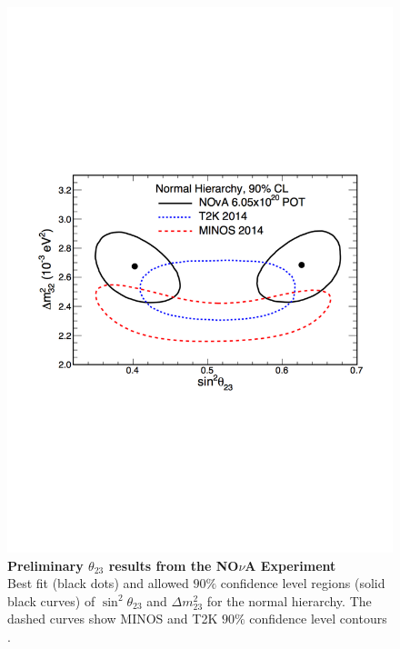 \begin{figure}
	\begin{center}
		\includegraphics[scale=0.7]{Figures/nova_result.pdf}
		\caption[Preliminary $\theta_{23}$ results from the NO$\nu$A Experiment]{ {\textbf{Preliminary $\theta_{23}$ results from the NO$\nu$A Experiment}} \\ Best fit (black dots) and allowed $90\%$ confidence level regions (solid black curves) of $\sin^2 \theta_{23}$ and $\Delta m^2_{23}$ for the normal hierarchy. The dashed curves show MINOS \cite{MINOS} and T2K \cite{T2K} $90\%$ confidence level contours \cite{NOVA}.}
		\label{nova_result}	
	\end{center}
\end{figure} 
%

